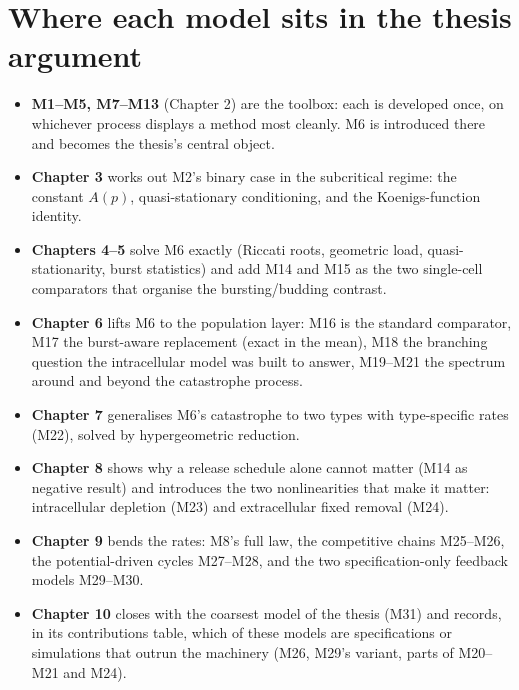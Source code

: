 \documentclass[11pt,a4paper]{report}
\theoremstyle{definition}
\begin{document}
\chapter*{Where each model sits in the thesis argument}

\begin{itemize}[leftmargin=1.6em,itemsep=0.35em]
\item \textbf{M1--M5, M7--M13} (Chapter 2) are the toolbox: each is
developed once, on whichever process displays a method most cleanly.
M6 is introduced there and becomes the thesis's central object.
\item \textbf{Chapter 3} works out M2's binary case in the subcritical
regime: the constant $A(p)$, quasi-stationary conditioning, and the
Koenigs-function identity.
\item \textbf{Chapters 4--5} solve M6 exactly (Riccati roots, geometric
load, quasi-stationarity, burst statistics) and add M14 and M15 as the two
single-cell comparators that organise the bursting/budding contrast.
\item \textbf{Chapter 6} lifts M6 to the population layer: M16 is the
standard comparator, M17 the burst-aware replacement (exact in the mean),
M18 the branching question the intracellular model was built to answer,
M19--M21 the spectrum around and beyond the catastrophe process.
\item \textbf{Chapter 7} generalises M6's catastrophe to two types with
type-specific rates (M22), solved by hypergeometric reduction.
\item \textbf{Chapter 8} shows why a release schedule alone cannot matter
(M14 as negative result) and introduces the two nonlinearities that make it
matter: intracellular depletion (M23) and extracellular fixed removal (M24).
\item \textbf{Chapter 9} bends the rates: M8's full law, the competitive
chains M25--M26, the potential-driven cycles M27--M28, and the two
specification-only feedback models M29--M30.
\item \textbf{Chapter 10} closes with the coarsest model of the thesis
(M31) and records, in its contributions table, which of these models are
specifications or simulations that outrun the machinery (M26, M29's
variant, parts of M20--M21 and M24).
\end{itemize}
\end{document}
